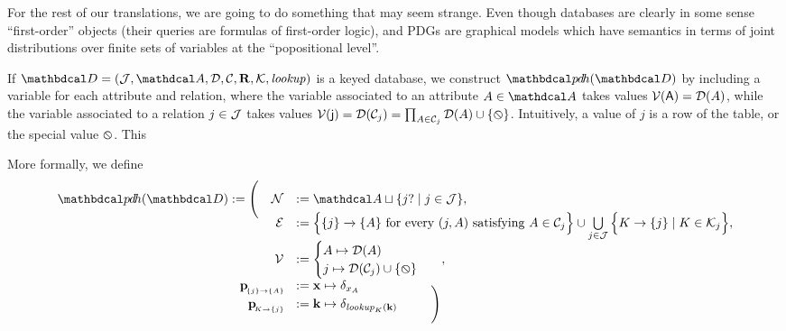 \documentclass[the-pdg-manual.tex]{subfiles}
\begin{document}
\begin{defn}

\end{defn}

For the rest of our translations, we are going to do something that may seem strange. Even though databases are clearly in some sense ``first-order'' objects (their queries are formulas of first-order logic), and PDGs are graphical models which have semantics in terms of joint distributions over finite sets of variables at the ``popositional level''.


\begin{defn}\label{def:expanded-rel-translation}
    If $\D = (\Idx,\Attrs,\Doms,\Cols,\Rels,\Keys, \mathit{lookup})$ is a keyed database, we construct $\PDHof\D$ by
    including a variable for each attribute and relation, where the variable associated to an attribute $A \in \Attrs$ takes values $\mathcal V(\mathsf{A}) = {\mathcal D}(A)$, while the variable associated to a relation $j \in \mathcal J$ takes values $\mathcal V(\mathsf{j}) = {\mathcal D}(\mathcal C_j) = \prod_{A \in \mathcal C_j}{\mathcal D}(A) \cup \{\varobslash\}$. Intuitively, a value of $j$ is a row of the table, or the special value $\varobslash$. This

    More formally, we define
    \[
    \begin{array}{rl}%
        \PDHof{\D} := \Bigg(\quad	\N &:=  \Attrs \sqcup \{ j? \mid j \in \Idx\},
        \\[-0.5em]
        \Ed &:= \Big\{ \ed{}{\{j\}}{\{A\}} \text{ for every }(j,A)\text{ satisfying } A\in \Cols_j \Big\}
            \cup \bigcup\limits_{j \in \Idx}\Big\{ K \to \{ j \} \mid K \in \Keys_j\Big\},
         \\[0.5em]
        \V &:=
        \begin{cases}
            A \mapsto \Doms(A) \\
            j \mapsto \Doms(\Cols_j) \cup \{\none\}
        \end{cases}~~, %
        \\
        \bp[\{j\}\to\{A\}] &:= \mat x \mapsto \delta_{x_{A}}
        \\[-0.7em]
        \bp[K\to\{j\}] &:= \mat k \mapsto \delta_{\mathit{lookup}_K(\mat k)}~~\qquad \Bigg)

    \end{array}
    \]
\end{defn}
\end{document}
